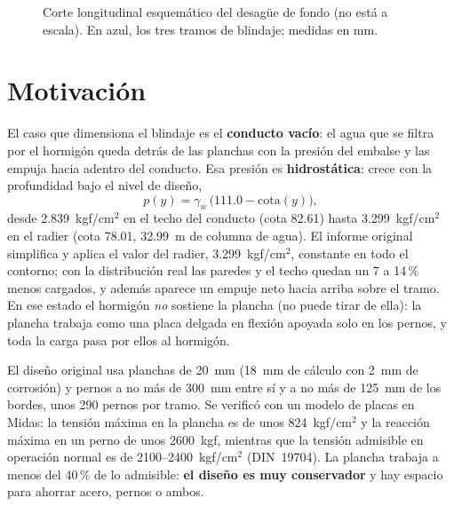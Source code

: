 \documentclass[11pt]{article}
\begin{document}
\begin{figure}[h]
\caption{Corte longitudinal esquem\'atico del desag\"ue de fondo (no est\'a a escala). En azul, los tres
tramos de blindaje; medidas en mm.}
\label{fig:corte}
\end{figure}

\section{Motivaci\'on}

El caso que dimensiona el blindaje es el \textbf{conducto vac\'io}: el agua que se filtra por el
hormig\'on queda detr\'as de las planchas con la presi\'on del embalse y las empuja hacia adentro del
conducto. Esa presi\'on es \textbf{hidrost\'atica}: crece con la profundidad bajo el nivel de dise\~no,
\[
  p(y) = \gamma_w\,\big(111.0 - \text{cota}(y)\big),
\]
desde 2.839~kgf/cm$^2$ en el techo del conducto (cota 82.61) hasta 3.299~kgf/cm$^2$ en el radier (cota
78.01, 32.99~m de columna de agua). El informe original simplifica y aplica el valor del radier,
3.299~kgf/cm$^2$, constante en todo el contorno; con la distribuci\'on real las paredes y el techo
quedan un 7 a 14\,\% menos cargados, y adem\'as aparece un empuje neto hacia arriba sobre el tramo.
En ese estado el hormig\'on \emph{no} sostiene la plancha (no puede tirar de ella): la plancha trabaja
como una placa delgada en flexi\'on apoyada solo en los pernos, y toda la carga pasa por ellos al
hormig\'on.

El dise\~no original usa planchas de 20~mm (18~mm de c\'alculo con 2~mm de corrosi\'on) y pernos a no
m\'as de 300~mm entre s\'i y a no m\'as de 125~mm de los bordes, unos 290 pernos por tramo. Se verific\'o
con un modelo de placas en Midas: la tensi\'on m\'axima en la plancha es de unos 824~kgf/cm$^2$ y la
reacci\'on m\'axima en un perno de unos 2600~kgf, mientras que la tensi\'on admisible en operaci\'on
normal es de 2100--2400~kgf/cm$^2$ (DIN~19704). La plancha trabaja a menos del 40\,\% de lo admisible:
\textbf{el dise\~no es muy conservador} y hay espacio para ahorrar acero, pernos o ambos.
\end{document}
